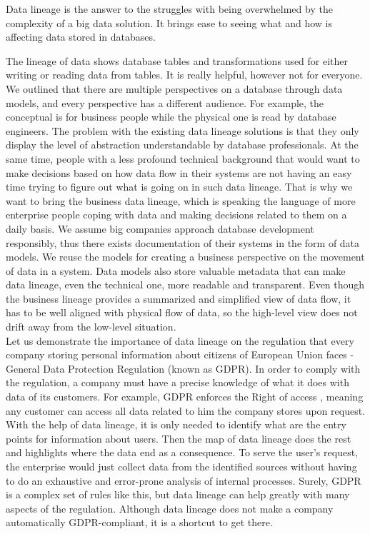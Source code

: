 Data lineage is the answer to the struggles with being overwhelmed by the complexity of a big data solution. It brings ease to seeing what and how is affecting data stored in databases.

The lineage of data shows database tables and transformations used for either writing or reading data from tables.  It is really helpful, however not for everyone. 
We outlined that there are multiple perspectives on a database through data models, and every perspective has a different audience. For example, the conceptual is for business people while the physical one is read by database engineers.
The problem with the existing data lineage solutions is that they only display the level of abstraction understandable by database professionals. 
At the same time, people with a less profound technical background that would want to make decisions based on how data flow in their systems are not having an easy time trying to figure out what is going on in such data lineage.
That is why we want to bring the business data lineage, which is speaking the language of more enterprise people coping with data and making decisions related to them on a daily basis. We assume big companies approach database development responsibly, thus there exists documentation of their systems in the form of data models. 
We reuse the models for creating a business perspective on the movement of data in a system. 
Data models also store valuable metadata that can make data lineage, even the technical one, more readable and transparent.
Even though the business lineage provides a summarized and simplified view of data flow, it has to be well aligned with physical flow of data, so the high-level view does not drift away from the low-level situation.\\

Let us demonstrate the importance of data lineage on the regulation that every company storing personal information about citizens of European Union faces - General Data Protection Regulation (known as GDPR).
In order to comply with the regulation, a company must have a precise knowledge of what it does with data of its customers.  
For example, GDPR enforces the Right of access \cite{RightOfAccess}, meaning any customer can access all data related to him the company stores upon request. With the help of data lineage, it is only needed to identify what are the entry points for information about users. Then the map of data lineage does the rest and highlights where the data end as a consequence. To serve the user's request, the enterprise would just collect data from the identified sources without having to do an exhaustive and error-prone analysis of internal processes.
Surely, GDPR is a complex set of rules like this, but data lineage can help greatly with many aspects of the regulation. Although data lineage does not make a company automatically GDPR-compliant, it is a shortcut to get there. 


